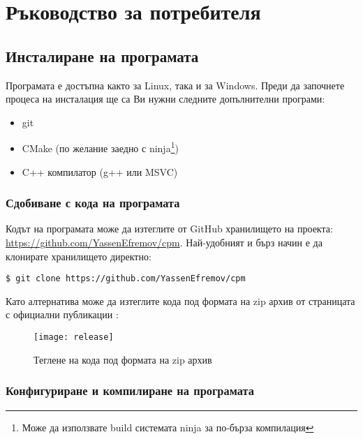 \graphicspath{ {./chapter4/images/} }

\chapter{Ръководство за потребителя}


\section{Инсталиране на програмата}

Програмата е достъпна както за Linux, така и за Windows. Преди да започнете
процеса на инсталация ще са Ви нужни следните допълнителни програми:

\begin{itemize}
    \item git
    \item CMake (по желание заедно с ninja\footnote{Може да използвате build
          системата ninja за по-бърза компилация})
	\item C++ компилатор (g++ или MSVC)
\end{itemize}


\subsection{Сдобиване с кода на програмата}

Кодът на програмата може да изтеглите от GitHub хранилището на проекта:
\url{https://github.com/YassenEfremov/cpm}. Най-удобният и бърз начин е да
клонирате хранилището директно:

\begin{lstlisting}[style=shell]
$ git clone https://github.com/YassenEfremov/cpm
\end{lstlisting}

Като алтернатива може да изтеглите кода под формата на zip архив от страницата с
официални публикации :

\begin{figure}[h]
    \centering
    \texttt{[image: release]}
    \caption{Теглене на кода под формата на zip архив}
    \label{fig:download-zip}
\end{figure}


\subsection{Конфигуриране и компилиране на програмата}

